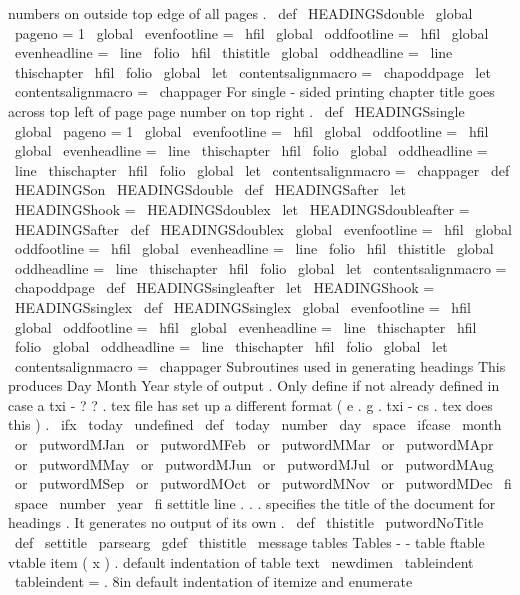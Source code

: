 numbers
on
outside
top
%
edge
of
all
pages
.
\
def
\
HEADINGSdouble
{
%
\
global
\
pageno
=
1
\
global
\
evenfootline
=
{
\
hfil
}
\
global
\
oddfootline
=
{
\
hfil
}
\
global
\
evenheadline
=
{
\
line
{
\
folio
\
hfil
\
thistitle
}
}
\
global
\
oddheadline
=
{
\
line
{
\
thischapter
\
hfil
\
folio
}
}
\
global
\
let
\
contentsalignmacro
=
\
chapoddpage
}
\
let
\
contentsalignmacro
=
\
chappager
%
For
single
-
sided
printing
chapter
title
goes
across
top
left
of
page
%
page
number
on
top
right
.
\
def
\
HEADINGSsingle
{
%
\
global
\
pageno
=
1
\
global
\
evenfootline
=
{
\
hfil
}
\
global
\
oddfootline
=
{
\
hfil
}
\
global
\
evenheadline
=
{
\
line
{
\
thischapter
\
hfil
\
folio
}
}
\
global
\
oddheadline
=
{
\
line
{
\
thischapter
\
hfil
\
folio
}
}
\
global
\
let
\
contentsalignmacro
=
\
chappager
}
\
def
\
HEADINGSon
{
\
HEADINGSdouble
}
\
def
\
HEADINGSafter
{
\
let
\
HEADINGShook
=
\
HEADINGSdoublex
}
\
let
\
HEADINGSdoubleafter
=
\
HEADINGSafter
\
def
\
HEADINGSdoublex
{
%
\
global
\
evenfootline
=
{
\
hfil
}
\
global
\
oddfootline
=
{
\
hfil
}
\
global
\
evenheadline
=
{
\
line
{
\
folio
\
hfil
\
thistitle
}
}
\
global
\
oddheadline
=
{
\
line
{
\
thischapter
\
hfil
\
folio
}
}
\
global
\
let
\
contentsalignmacro
=
\
chapoddpage
}
\
def
\
HEADINGSsingleafter
{
\
let
\
HEADINGShook
=
\
HEADINGSsinglex
}
\
def
\
HEADINGSsinglex
{
%
\
global
\
evenfootline
=
{
\
hfil
}
\
global
\
oddfootline
=
{
\
hfil
}
\
global
\
evenheadline
=
{
\
line
{
\
thischapter
\
hfil
\
folio
}
}
\
global
\
oddheadline
=
{
\
line
{
\
thischapter
\
hfil
\
folio
}
}
\
global
\
let
\
contentsalignmacro
=
\
chappager
}
%
Subroutines
used
in
generating
headings
%
This
produces
Day
Month
Year
style
of
output
.
%
Only
define
if
not
already
defined
in
case
a
txi
-
?
?
.
tex
file
has
set
%
up
a
different
format
(
e
.
g
.
txi
-
cs
.
tex
does
this
)
.
\
ifx
\
today
\
undefined
\
def
\
today
{
%
\
number
\
day
\
space
\
ifcase
\
month
\
or
\
putwordMJan
\
or
\
putwordMFeb
\
or
\
putwordMMar
\
or
\
putwordMApr
\
or
\
putwordMMay
\
or
\
putwordMJun
\
or
\
putwordMJul
\
or
\
putwordMAug
\
or
\
putwordMSep
\
or
\
putwordMOct
\
or
\
putwordMNov
\
or
\
putwordMDec
\
fi
\
space
\
number
\
year
}
\
fi
%
settitle
line
.
.
.
specifies
the
title
of
the
document
for
headings
.
%
It
generates
no
output
of
its
own
.
\
def
\
thistitle
{
\
putwordNoTitle
}
\
def
\
settitle
{
\
parsearg
{
\
gdef
\
thistitle
}
}
\
message
{
tables
}
%
Tables
-
-
table
ftable
vtable
item
(
x
)
.
%
default
indentation
of
table
text
\
newdimen
\
tableindent
\
tableindent
=
.
8in
%
default
indentation
of
itemize
and
enumerate
